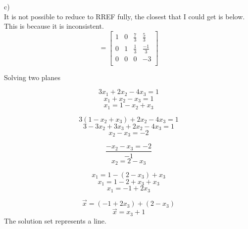 \documentclass[12pt]{article}
\newenvironment{problem}[2][Problem]{\begin{trivlist}
\item[\hskip \labelsep {\bfseries #1}\hskip \labelsep {\bfseries #2.}]}{\end{trivlist}}
\begin{document}
c)\\
It is not possible to reduce to RREF fully, the closest that I could get is below.
This is because it is inconsistent.
	\[=
		\left[
		\begin{array}{ccc|c}
		1 & 0 & \frac{7}{3} & \frac{5}{3} \\
		0 & 1 & \frac{1}{3} & \frac{-1}{3}\\
		0 & 0 & 0 & -3\\
		\end{array}
		\right]
	\]
\begin{problem}{4}
	Solving two planes
\end{problem}
	\[3x_1 + 2x_2 -4x_3 = 1\]
	\[x_1 + x_2 - x_3 = 1\]
	\[x_1 = 1 - x_2 + x_3\]
	
	
	\[3(1 - x_2 + x_3) + 2x_2 - 4x_3 = 1\]
	\[3 - 3x_2 + 3x_3 + 2x_2 - 4x_3 = 1\]
	\[x_2 -x_3 = -2\]
	
	
	\[\frac{-x_2 -x_3 = -2}{-1}\]
	\[x_2 = 2 - x_3\]
	
	
	\[x_1 = 1 - (2 - x_3) + x_3\]
	\[x_1 = 1 - 2 + x_3 + x_3\]
	\[x_1 = -1 + 2x_3\]
	
	\[\vec x = (-1 + 2x_3) + (2 - x_3)\]
	\[\vec x = x_3 + 1\]
The solution set represents a line. 	
\end{document}
